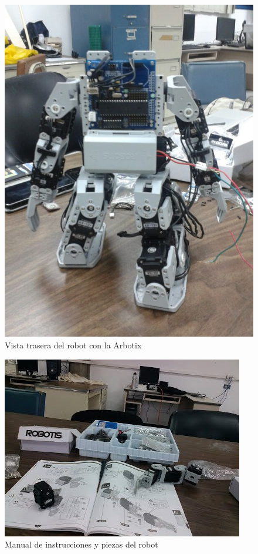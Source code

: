 \begin{figure}[hbtp]
\centering
\includegraphics[scale=0.2]{imagenes/traseroDeJunny.jpg}
\caption{Vista trasera del robot con la Arbotix}
\label{fig:trasera2}
\end{figure}

\begin{figure}[hbtp]
\centering
\includegraphics[scale=0.5]{imagenes/CIMG0225.jpg}
\caption{Manual de instrucciones y piezas del robot}
\end{figure}

